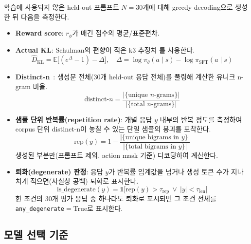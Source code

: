 \documentclass[conference]{IEEEtran}
\begin{document}
학습에 사용되지 않은 held-out 프롬프트 $N{=}30$개에 대해 greedy
decoding으로 생성한 뒤 다음을 측정한다.

\begin{itemize}
  \item \textbf{Reward score}: $r_\phi$가 매긴 점수의 평균/표준편차.
  \item \textbf{Actual KL}: Schulman의 편향이 적은 k3 추정치
        \cite{schulman2017ppo}를 사용한다.
        \begin{equation}
        \widehat{D}_{\mathrm{KL}} = \mathbb{E}\big[(e^{\Delta} - 1) -
        \Delta\big], \quad \Delta = \log\pi_\theta(a\mid s) -
        \log\pi_{\text{SFT}}(a\mid s)
        \label{eq:klhat}
        \end{equation}
  \item \textbf{Distinct-n}~\cite{li2016diversity}: 생성문 전체(30개
        held-out 응답 전체)를 풀링해 계산한 유니크 n-gram 비율.
        \begin{equation}
        \text{distinct-}n = \frac{|\{\text{unique } n\text{-grams}\}|}
        {|\{\text{total } n\text{-grams}\}|}
        \label{eq:distinctn}
        \end{equation}
  \item \textbf{샘플 단위 반복률(repetition rate)}: 개별 응답 $y$ 내부의
        반복 정도를 측정하여 corpus 단위 distinct-n이 놓칠 수 있는 단일
        샘플의 붕괴를 포착한다.
        \begin{equation}
        \text{rep}(y) = 1 - \frac{|\{\text{unique bigrams in } y\}|}
        {|\{\text{total bigrams in } y\}|}
        \label{eq:reprate}
        \end{equation}
        생성된 부분만(프롬프트 제외, action mask 기준) 디코딩하여 계산한다.
  \item \textbf{퇴화(degenerate) 판정}: 응답 $y$가 반복률 임계값을 넘거나
        생성 토큰 수가 지나치게 적으면(사실상 공백) 퇴화로 표시한다.
        \begin{equation}
        \text{is\_degenerate}(y) = \mathbb{1}\big[\text{rep}(y) > \tau_{\text{rep}}
        \ \lor\ |y| < \tau_{\text{len}}\big]
        \label{eq:degenerate}
        \end{equation}
        한 조건의 30개 평가 응답 중 하나라도 퇴화로 표시되면 그 조건 전체를
        \texttt{any\_degenerate}$=$True로 표시한다.
\end{itemize}

\subsection{모델 선택 기준}
\label{sec:selection}
\end{document}
